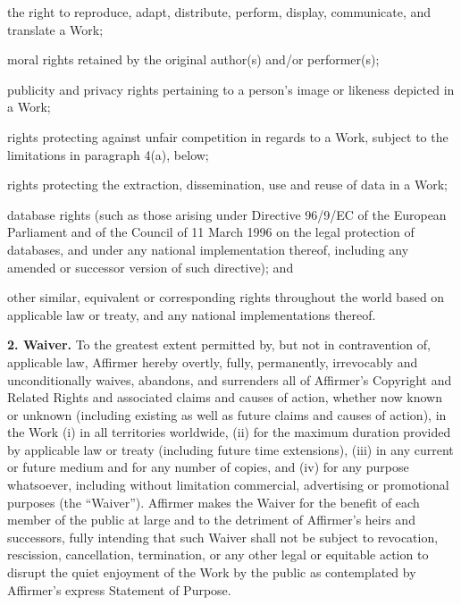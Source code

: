 \begin{doclicense@enumerate}
\item the right to reproduce, adapt, distribute, perform,
display, communicate, and translate a Work;
\item  moral rights retained by the original author(s) and/or
performer(s);
\item publicity and privacy rights pertaining to a person's
image or likeness depicted in a Work;
\item rights protecting against unfair competition in regards
to a Work, subject to the limitations in paragraph 4(a),
below;
\item rights protecting the extraction, dissemination, use and
reuse of data in a Work;
\item database rights (such as those arising under Directive
96/9/EC of the European Parliament and of the Council of 11
March 1996 on the legal protection of databases, and under
any national implementation thereof, including any amended
or successor version of such directive); and
\item other similar, equivalent or corresponding rights
throughout the world based on applicable law or treaty, and
any national implementations thereof.
\end{doclicense@enumerate}
\par \textbf{2. Waiver.} To the greatest extent
permitted by, but not in contravention of, applicable law,
Affirmer hereby overtly, fully, permanently, irrevocably and
unconditionally waives, abandons, and surrenders all of
Affirmer's Copyright and Related Rights and associated claims
and causes of action, whether now known or unknown (including
existing as well as future claims and causes of action), in
the Work (i) in all territories worldwide, (ii) for the
maximum duration provided by applicable law or treaty
(including future time extensions), (iii) in any current or
future medium and for any number of copies, and (iv) for any
purpose whatsoever, including without limitation commercial,
advertising or promotional purposes (the ``Waiver''). Affirmer
makes the Waiver for the benefit of each member of the public
at large and to the detriment of Affirmer's heirs and
successors, fully intending that such Waiver shall not be
subject to revocation, rescission, cancellation, termination,
or any other legal or equitable action to disrupt the quiet
enjoyment of the Work by the public as contemplated by
Affirmer's express Statement of Purpose.

